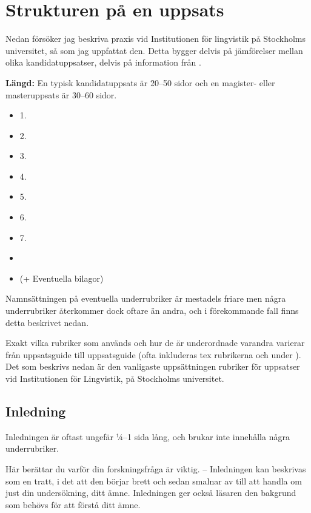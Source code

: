 
\section{Strukturen på en uppsats}
\label{struktur}

Nedan försöker jag beskriva praxis vid Institutionen för lingvistik på
Stockholms universitet, så som jag uppfattat den. Detta bygger delvis på
jämförelser mellan olika kandidatuppsatser, delvis på information från
\citet{schott+others-2007, wiren-2020}.

\textbf{Längd:} En typisk kandidatuppsats är 20--50 sidor och en magister-
eller masteruppsats är 30--60 sidor.

\begin{itemize}
\item1. 
\item2. 
\item3. 
\item4. 
\item5. 
\item6. 
\item7. 
\item{}
\item (+ Eventuella bilagor)
\end{itemize}

\noindent Namnsättningen på eventuella underrubriker är mestadels friare men
några underrubriker återkommer dock oftare än andra, och i förekommande fall
finns detta beskrivet nedan.

Exakt vilka rubriker som används och hur de är underordnade varandra varierar
från uppsatsguide till uppsatsguide (ofta inkluderas tex rubrikerna
\emph{} och \emph{} under
\emph{}). Det som beskrivs nedan är den vanligaste
uppsättningen rubriker för uppsatser vid Institutionen för Lingvistik, på
Stockholms universitet.


\subsection{Inledning}
\label{rubrik.inledning}

Inledningen är oftast ungefär ¼--1 sida lång, och brukar inte innehålla några
underrubriker.

Här berättar du varför din forskningsfråga är viktig. – Inledningen kan
beskrivas som en tratt, i det att den börjar brett och sedan smalnar av till
att handla om just din undersökning, ditt ämne. Inledningen ger också läsaren
den bakgrund som behövs för att förstå ditt ämne.

